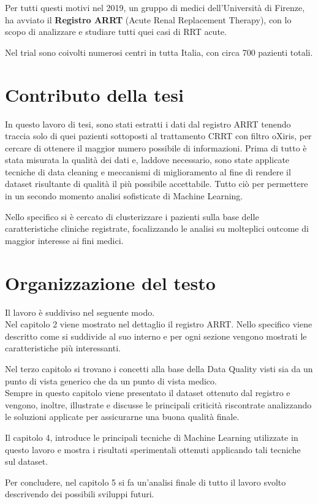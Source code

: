 Per tutti questi motivi nel 2019, un gruppo di medici dell'Università di Firenze, ha avviato il  \textbf{Registro ARRT} (Acute Renal Replacement Therapy), con lo scopo di analizzare e studiare tutti quei casi di RRT acute.

Nel trial sono coivolti numerosi centri in tutta Italia, con circa 700 pazienti totali.

\section{Contributo della tesi}

In questo lavoro di tesi, sono stati estratti i dati dal registro ARRT tenendo traccia solo di quei pazienti sottoposti al trattamento CRRT con filtro oXiris, per cercare di ottenere il maggior numero possibile di informazioni. Prima di tutto è stata misurata la qualità dei dati e, laddove necessario, sono state applicate tecniche di data cleaning e meccanismi di miglioramento al fine di rendere il dataset risultante di qualità il più possibile accettabile. Tutto ciò per permettere in un secondo momento analisi sofisticate di Machine Learning.

Nello specifico si è cercato di clusterizzare i pazienti sulla base delle caratteristiche cliniche registrate, focalizzando le analisi su molteplici outcome di maggior interesse ai fini medici.


\section{Organizzazione del testo}

Il lavoro è suddiviso nel seguente modo.\\ 
Nel capitolo 2 viene mostrato nel dettaglio il registro ARRT. Nello specifico viene descritto come si suddivide al suo interno e per ogni sezione vengono mostrati le caratteristiche più interessanti.

Nel terzo capitolo si trovano i concetti alla base della Data Quality visti sia da un punto di vista generico che da un punto di vista medico. \\
Sempre in questo capitolo viene presentato il dataset ottenuto dal registro e vengono, inoltre, illustrate e discusse le principali criticità  riscontrate analizzando le soluzioni applicate per assicurarne una buona qualità finale.

Il capitolo 4, introduce le principali tecniche di Machine Learning utilizzate in questo lavoro e mostra i risultati sperimentali ottenuti applicando tali tecniche sul dataset.

Per concludere, nel capitolo 5 si fa un'analisi finale di tutto il lavoro svolto descrivendo dei possibili sviluppi futuri.


